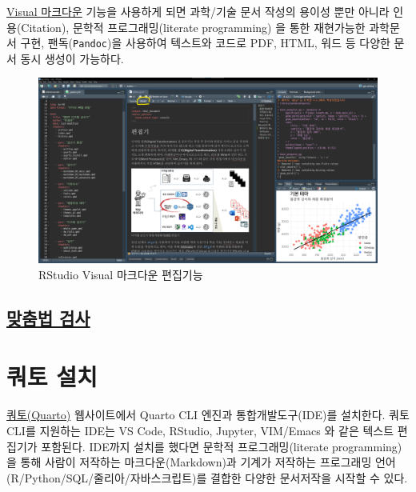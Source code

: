 \documentclass[
  letterpaper,
]{book}
\begin{document}
\href{https://rstudio.github.io/visual-markdown-editing}{Visual
마크다운} 기능을 사용하게 되면 과학/기술 문서 작성의 용이성 뿐만 아니라
인용(Citation), 문학적 프로그래밍(literate programming) 을 통한
재현가능한 과학문서 구현, 팬독(\texttt{Pandoc})을 사용하여 텍스트와
코드로 PDF, HTML, 워드 등 다양한 문서 동시 생성이 가능하다.

\begin{figure}

{\centering \includegraphics{images/visual-edit-execute-code.png}

}

\caption{RStudio Visual 마크다운 편집기능}

\end{figure}

\hypertarget{uxb9deuxcda4uxbc95-uxac80uxc0ac}{%
\subsection{\texorpdfstring{\protect\hypertarget{spelling-check}{\href{https://statkclee.github.io/comp_document/cd-rstudio-wp.html}{맞춤법
검사}}}{맞춤법 검사}}\label{uxb9deuxcda4uxbc95-uxac80uxc0ac}}

\hypertarget{uxcffcuxd1a0-uxc124uxce58}{%
\section{쿼토 설치}\label{uxcffcuxd1a0-uxc124uxce58}}

\href{https://quarto.org/}{쿼토(Quarto)} 웹사이트에서 Quarto CLI 엔진과
통합개발도구(IDE)를 설치한다. 쿼토 CLI를 지원하는 IDE는 VS Code,
RStudio, Jupyter, VIM/Emacs 와 같은 텍스트 편집기가 포함된다. IDE까지
설치를 했다면 문학적 프로그래밍(literate programming)을 통해 사람이
저작하는 마크다운(Markdown)과 기계가 저작하는 프로그래밍
언어(R/Python/SQL/줄리아/자바스크립트)를 결합한 다양한 문서저작을 시작할
수 있다.
\end{document}
